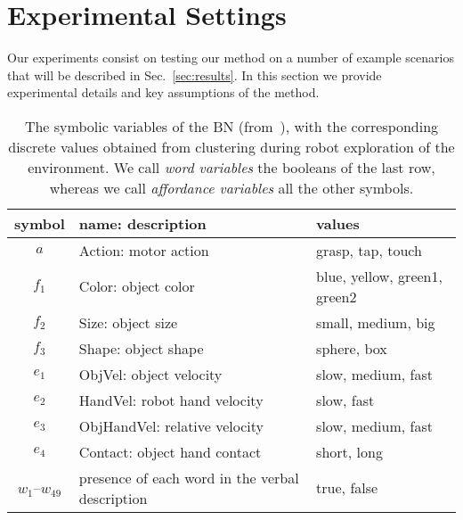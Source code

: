 
\section{Experimental Settings}
\label{sec:experimental_settings}
Our experiments consist on testing our method on a number of example scenarios that will be described in Sec.~\ref{sec:results}.
In this section we provide experimental details and key assumptions of the method.

\begin{table}
    \centering
    \caption{The symbolic variables of the \acl{BN} (from~\cite{salvi:2012:smcb}), with the corresponding discrete values obtained from clustering during robot exploration of the environment.
    We call \emph{word variables} the booleans of the last row, whereas we call \emph{affordance variables} all the other symbols.}
    \label{tab:bnsymb}
    \begin{tabular}{cp{3.3cm}l}
    \toprule
    symbol & name: description     & values \\
    \midrule
    $a$    & Action: motor action  & grasp, tap, touch \\
    \midrule
    $f_1$  & Color: object color   & blue, yellow, green1, green2 \\
    $f_2$  & Size: object size     & small, medium, big \\
    $f_3$  & Shape: object shape   & sphere, box \\ %
    \midrule
    $e_1$  & ObjVel: object velocity                     & slow, medium, fast \\
    $e_2$  & HandVel: robot hand velocity                & slow, fast \\
    $e_3$  & ObjHandVel: relative \objecthand{} velocity & slow, medium, fast \\
    $e_4$  & Contact: object hand contact                & short, long \\
    \midrule
    $w_1$--$w_{49}$ & presence of each word in the verbal description & true, false \\
    \bottomrule
    \end{tabular}
\end{table}


